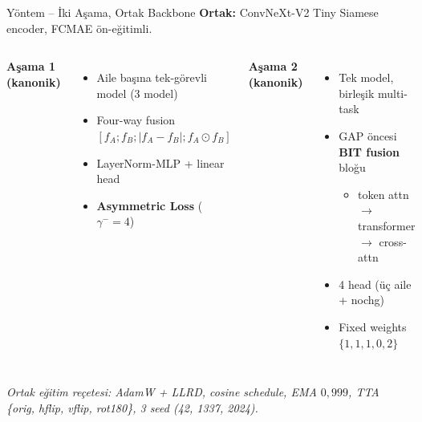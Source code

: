 \documentclass[10pt,aspectratio=169]{beamer}
\begin{document}
\begin{frame}{Yöntem -- İki Aşama, Ortak Backbone}
  \textbf{Ortak:} ConvNeXt-V2 Tiny Siamese encoder, FCMAE ön-eğitimli.
  \vspace{0.8em}
  \begin{columns}[T,onlytextwidth]
      \textbf{Aşama 1 (kanonik)}
      \begin{itemize}
        \item Aile başına tek-görevli model (3 model)
        \item Four-way fusion $[f_A; f_B; |f_A{-}f_B|; f_A \odot f_B]$
        \item LayerNorm-MLP + linear head
        \item \textbf{Asymmetric Loss} ($\gamma^-{=}4$)
      \end{itemize}
      \textbf{Aşama 2 (kanonik)}
      \begin{itemize}
        \item Tek model, birleşik multi-task
        \item GAP öncesi \textbf{BIT fusion} bloğu
          \begin{itemize}
            \item token attn $\to$ transformer $\to$ cross-attn
          \end{itemize}
        \item 4 head (üç aile + nochg)
        \item Fixed weights $\{1, 1, 1, 0{,}2\}$
      \end{itemize}
  \end{columns}
  \vspace{0.6em}
  \scriptsize\itshape
  Ortak eğitim reçetesi: AdamW + LLRD, cosine schedule, EMA $0{,}999$, TTA \{orig, hflip, vflip, rot180\}, 3 seed (42, 1337, 2024).
\end{frame}
\end{document}
